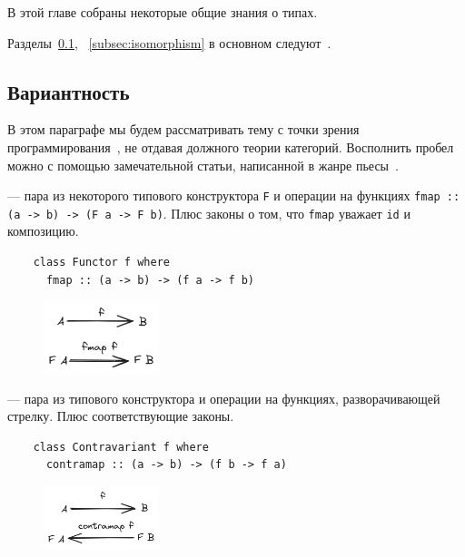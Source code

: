 
В этой главе собраны некоторые общие знания о типах.

Разделы~\ref{subsec:variance}, ~\ref{subsec:isomorphism} в основном следуют~\cite[глава 1]{maguire-types}.

\subsection{Вариантность} \label{subsec:variance} %

В этом параграфе мы будем рассматривать тему с точки зрения программирования~\cite[глава 3]{maguire-types}, не отдавая должного теории категорий.
Восполнить пробел можно с помощью замечательной статьи, написанной в жанре пьесы~\cite{hinze2012functional}.

 --- пара из некоторого типового конструктора \texttt{F} и операции на функциях \texttt{fmap :: (a -> b) -> (F a -> F b)}.
Плюс законы о том, что \texttt{fmap} уважает \texttt{id} и композицию.

\begin{verbatim}
    class Functor f where
      fmap :: (a -> b) -> (f a -> f b)
\end{verbatim}

\begin{figure}[H]
    \centering
    \includegraphics[width=0.3\textwidth]{figs/functor}
\end{figure}

 --- пара из типового конструктора и операции на функциях, разворачивающей стрелку.
Плюс соответствующие законы.

\begin{verbatim}
    class Contravariant f where
      contramap :: (a -> b) -> (f b -> f a)
\end{verbatim}

\begin{figure}[H]
    \centering
    \includegraphics[width=0.3\textwidth]{figs/contra-functor}
\end{figure}

